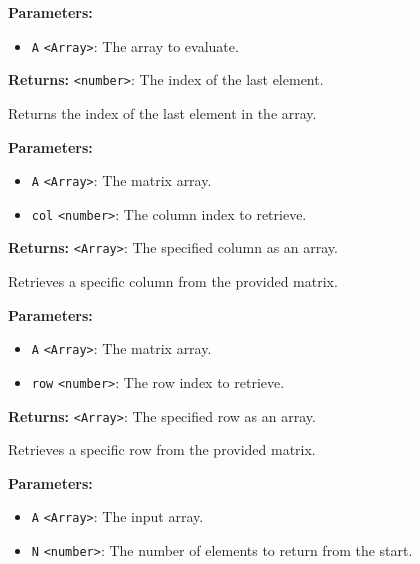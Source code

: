 \documentclass[12pt,a4paper]{article}
\begin{document}
\noindent \textbf{Parameters:}
\begin{itemize}
  \item \texttt{A} \texttt{<Array>}: The array to evaluate.
\end{itemize}

\noindent \textbf{Returns:} \texttt{<number>}: The index of the last element.

\noindent Returns the index of the last element in the array.

\vspace{5mm}
\noindent {}


\noindent \textbf{Parameters:}
\begin{itemize}
  \item \texttt{A} \texttt{<Array>}: The matrix array.
  \item \texttt{col} \texttt{<number>}: The column index to retrieve.
\end{itemize}

\noindent \textbf{Returns:} \texttt{<Array>}: The specified column as an array.

\noindent Retrieves a specific column from the provided matrix.

\vspace{5mm}
\noindent {}


\noindent \textbf{Parameters:}
\begin{itemize}
  \item \texttt{A} \texttt{<Array>}: The matrix array.
  \item \texttt{row} \texttt{<number>}: The row index to retrieve.
\end{itemize}

\noindent \textbf{Returns:} \texttt{<Array>}: The specified row as an array.

\noindent Retrieves a specific row from the provided matrix.

\vspace{5mm}
\noindent {}


\noindent \textbf{Parameters:}
\begin{itemize}
  \item \texttt{A} \texttt{<Array>}: The input array.
  \item \texttt{N} \texttt{<number>}: The number of elements to return from the start.
\end{itemize}
\end{document}
